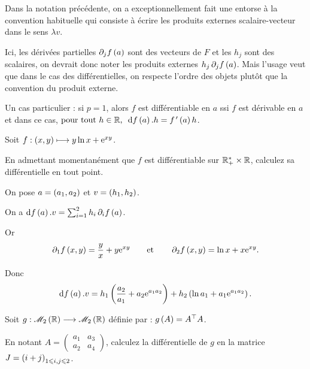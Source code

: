 \begin{rem}
Dans la notation précédente, on a exceptionnellement fait une entorse à la convention habituelle qui consiste à écrire les produits externes scalaire-vecteur dans le sens \(\lambda v\).

Ici, les dérivées partielles \(\pdif{j}f\paren{a}\) sont des vecteurs de \(F\) et les \(h_j\) sont des scalaires, on devrait donc noter les produits externes \(h_j\pdif{j}f\paren{a}\). Mais l'usage veut que dans le cas des différentielles, on respecte l'ordre des objets plutôt que la convention du produit externe.
\end{rem}

Un cas particulier : si \(p=1\), alors \(f\) est différentiable en \(a\) ssi \(f\) est dérivable en \(a\) et dans ce cas, \(\quantifs{\tpt h\in\R}\odif{f}\paren{a}.h=f\prim\paren{a}h\).

\begin{exo}
Soit \(f:\left(x,y\right)\longmapsto y\ln x+\mathrm{e}^{xy}\).

En admettant momentanément que \(f\) est différentiable sur \(\mathbb{R}_+^*\times\mathbb{R}\), calculez sa différentielle en tout point.
\end{exo}

\begin{corr}
On pose \(a=\left(a_1,a_2\right)\) et \(v=\left(h_1,h_2\right)\).

On a \(\odif{f}\paren{a}.v=\sum_{i=1}^2h_i\pdif{i}f\paren{a}\).

Or \[\pdif{1}f\paren{x,y}=\dfrac{y}{x}+y\e{xy}\qquad\text{et}\qquad\pdif{2}f\paren{x,y}=\ln x+x\e{xy}.\]

Donc \[\odif{f}\paren{a}.v=h_1\paren{\dfrac{a_2}{a_1}+a_2\e{a_1a_2}}+h_2\paren{\ln a_1+a_1\e{a_1a_2}}.\]
\end{corr}

\begin{exo}
Soit \(g:\M{2}[\R]\to\M{2}[\R]\) définie par : \(g\left(A\right)=A^{\top}A\).

En notant \(A=\begin{pmatrix}
a_1 & a_3 \\
a_2 & a_4
\end{pmatrix}\), calculez la différentielle de \(g\) en la matrice \(J=\left(i+j\right)_{1\leqslant i,j\leqslant2}\).
\end{exo}

